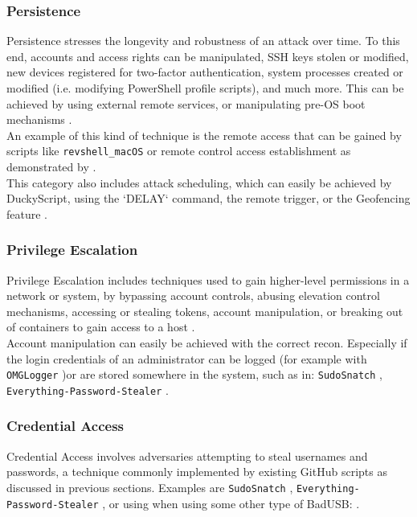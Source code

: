 \subsubsection{Persistence} \label{persistence}

Persistence stresses the longevity and robustness of an attack over time. To this end, accounts and access rights can be manipulated, SSH keys stolen or modified,
new devices registered for two-factor authentication, system processes created or modified  (i.e. modifying PowerShell profile scripts), and much more. This can be achieved by using external remote services, or manipulating pre-OS boot mechanisms \cite{MITREATTCK}. \\
An example of this kind of technique is the remote access that can be gained by scripts like \verb|revshell_macOS| \cite{OmgpayloadsPayloadsLibrary}
or remote control access establishment as demonstrated by \cite{bojovicRisingThreatHardware2019}. \\
This category also includes attack scheduling, which can easily be achieved by DuckyScript, using the `DELAY` command, the remote trigger, or the Geofencing feature \cite{hak5MGCable}.

\subsubsection{Privilege Escalation}

Privilege Escalation includes techniques used to gain higher-level permissions in a network or system, by bypassing account controls, abusing elevation control mechanisms, accessing or stealing tokens, account manipulation, or breaking out of containers to gain access to a host \cite{MITREATTCK}. \\
Account manipulation can easily be achieved with the correct recon. Especially if the login credentials of an administrator can be logged (for example with \verb|OMGLogger| \cite{OmgpayloadsPayloadsLibrary} )or are stored somewhere in the system, such as in: \verb|SudoSnatch| \cite{OmgpayloadsPayloadsLibrary}, \verb|Everything-Password-Stealer| \cite{OmgpayloadsPayloadsLibrary}.

\subsubsection{Credential Access}

Credential Access involves adversaries attempting to steal usernames and passwords, a technique commonly implemented by existing GitHub scripts as discussed in previous sections.
Examples are \verb|SudoSnatch| \cite{OmgpayloadsPayloadsLibrary}, \verb|Everything-Password-Stealer| \cite{OmgpayloadsPayloadsLibrary}, or using when using some other type of BadUSB:  \cite{muslimImplementationAnalysisUSB2020}.


